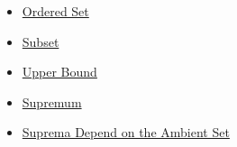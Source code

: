 \begin{dependencies}
\begin{itemize}
  \item \hyperref[def:ordered-set]{Ordered Set}
  \item \hyperref[def:subset]{Subset}
  \item \hyperref[def:real-upper-bound]{Upper Bound}
  \item \hyperref[def:supremum]{Supremum}
  \item \hyperref[prop:suprema-ambient-set]{Suprema Depend on the Ambient Set}
\end{itemize}
\end{dependencies}



